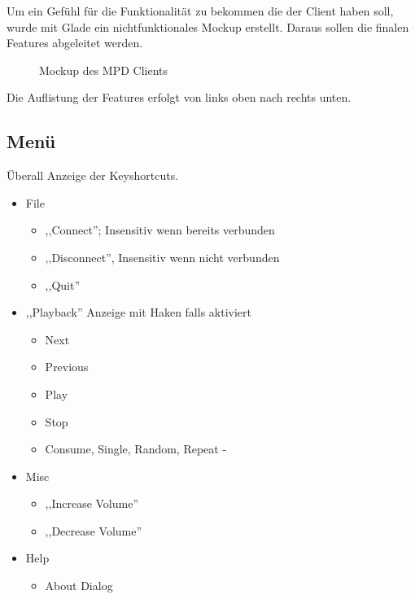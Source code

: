 Um ein Gefühl für die Funktionalität zu bekommen die der Client haben soll, wurde mit Glade ein nichtfunktionales Mockup erstellt.
Daraus sollen die finalen Features abgeleitet werden. 

\begin{figure}[h!]
    \caption{Mockup des MPD Clients}
    \label{p_mockup}
\end{figure}

Die Auflistung der Features erfolgt von links oben nach rechts unten.

\subsection{Menü}
Überall Anzeige der Keyshortcuts.
\begin{itemize}
\item File
  \begin{itemize}
  \item ,,Connect''; Insensitiv wenn bereits verbunden
  \item ,,Disconnect'', Insensitiv wenn nicht verbunden
  \item ,,Quit''
  \end{itemize} 
\item ,,Playback'' Anzeige mit Haken falls aktiviert 
  \begin{itemize}
  \item Next
  \item Previous
  \item Play
  \item Stop
  \item Consume, Single, Random, Repeat -
  \end{itemize}   
\item Misc
  \begin{itemize}
  \item ,,Increase Volume''
  \item ,,Decrease Volume''
  \end{itemize}
\item Help
  \begin{itemize}
  \item About Dialog
  \end{itemize}
\end{itemize}

